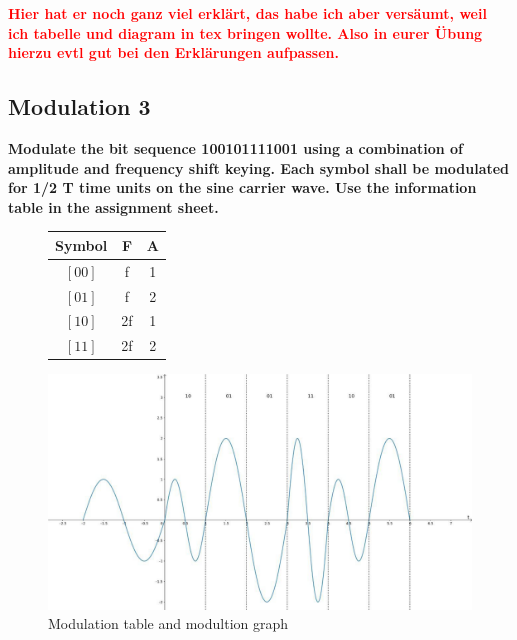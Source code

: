 \documentclass[a4paper,12pt]{article}
\begin{document}
	\textcolor{red}{\textbf{Hier hat er noch ganz viel erkl\"art, das habe ich aber vers\"aumt, weil ich tabelle und diagram in tex bringen wollte. Also in eurer \"Ubung hierzu evtl gut bei den Erkl\"arungen aufpassen.}}
	
	\newpage
	
	\subsection{Modulation 3}
	\textbf{Modulate the bit sequence 100101111001 using a combination of amplitude and frequency
	shift keying. Each symbol shall be modulated for 1/2 T time units on the sine carrier wave.
	Use the information table in the assignment sheet.}


    \begin{figure}[h!] 
	    \begin{minipage}{0.25\linewidth}
	    	\begin{tabular}{|c|c|c|}\hline
	    		\textbf{Symbol} & \textbf{F} & \textbf{A} \\ \hline
	    		$[00]$ & f & 1 \\
	    		$[01]$ & f & 2 \\
	    		$[10]$ & 2f & 1 \\
	    		$[11]$ & 2f & 2 \\ \hline
	    	\end{tabular}
	    \end{minipage}
	    \hfill
    	\begin{minipage}{0.74\linewidth}
    		\includegraphics[width=1\linewidth]{modulation3.jpg}
    	\end{minipage} 
	    \caption{Modulation table and modultion graph}
    \end{figure}
	
	
\end{document}
